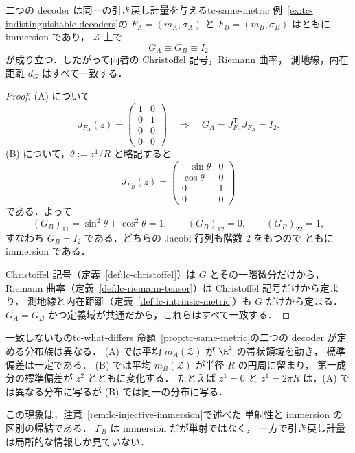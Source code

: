 \begin{proposition}{二つの decoder は同一の引き戻し計量を与える}{tc-same-metric}
  例~\ref{ex:tc-indistinguishable-decoders}の $F_A=(m_A,\sigma_A)$ と
  $F_B=(m_B,\sigma_B)$ はともに immersion であり，
  $\mathcal{Z}$ 上で
  \[
    G_A\equiv G_B\equiv I_2
  \]
  が成り立つ．したがって両者の Christoffel 記号，Riemann 曲率，
  測地線，内在距離 $d_G$ はすべて一致する．
\end{proposition}

\begin{proof}
  (A) について
  \[
    J_{F_A}(z)=
    \begin{pmatrix}1&0\\0&1\\0&0\\0&0\end{pmatrix}
    \quad\Longrightarrow\quad
    G_A=J_{F_A}^{\mathsf T}J_{F_A}=I_2 .
  \]
  (B) について，$\theta:=z^1/R$ と略記すると
  \[
    J_{F_B}(z)=
    \begin{pmatrix}
      -\sin\theta&0\\
      \cos\theta&0\\
      0&1\\
      0&0
    \end{pmatrix}
  \]
  である．よって
  \[
    (G_B)_{11}=\sin^2\theta+\cos^2\theta=1,
    \qquad
    (G_B)_{12}=0,
    \qquad
    (G_B)_{22}=1,
  \]
  すなわち $G_B=I_2$ である．どちらの Jacobi 行列も階数 $2$ をもつので
  ともに immersion である．

  Christoffel 記号（定義~\ref{def:lc-christoffel}）は $G$ とその一階微分だけから，
  Riemann 曲率（定義~\ref{def:lc-riemann-tensor}）は Christoffel 記号だけから定まり，
  測地線と内在距離（定義~\ref{def:lc-intrinsic-metric}）も $G$ だけから定まる．
  $G_A=G_B$ かつ定義域が共通だから，これらはすべて一致する．
\end{proof}

\begin{remark}{一致しないもの}{tc-what-differs}
  命題~\ref{prop:tc-same-metric}の二つの decoder が定める分布族は異なる．
  (A) では平均 $m_A(\mathcal{Z})$ が $\R^2$ の帯状領域を動き，
  標準偏差は一定である．
  (B) では平均 $m_B(\mathcal{Z})$ が半径 $R$ の円周に留まり，
  第一成分の標準偏差が $z^2$ とともに変化する．
  たとえば $z^1=0$ と $z^1=2\pi R$ は，(A) では異なる分布に写るが
  (B) では同一の分布に写る．

  この現象は，注意~\ref{rem:lc-injective-immersion}で述べた
  単射性と immersion の区別の帰結である．
  $F_B$ は immersion だが単射ではなく，
  一方で引き戻し計量は局所的な情報しか見ていない．
\end{remark}

